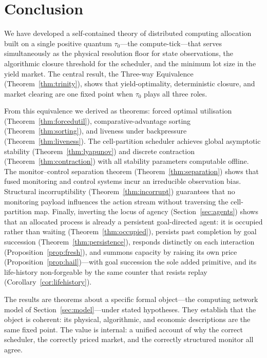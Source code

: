 \documentclass[11pt,twocolumn,a4paper]{article}
\theoremstyle{plain}
\theoremstyle{definition}
\theoremstyle{remark}
\newcommand{\tick}{\tau_0}
\begin{document}
\section{Conclusion}
\label{sec:conclusion}

We have developed a self-contained theory of distributed computing allocation built on a single positive quantum $\tick$---the compute-tick---that serves simultaneously as the physical resolution floor for state observations, the algorithmic closure threshold for the scheduler, and the minimum lot size in the yield market. The central result, the Three-way Equivalence (Theorem~\ref{thm:trinity}), shows that yield-optimality, deterministic closure, and market clearing are one fixed point when $\tick$ plays all three roles.

From this equivalence we derived as theorems: forced optimal utilisation (Theorem~\ref{thm:forcedutil}), comparative-advantage sorting (Theorem~\ref{thm:sorting}), and liveness under backpressure (Theorem~\ref{thm:liveness}). The cell-partition scheduler achieves global asymptotic stability (Theorem~\ref{thm:lyapunov}) and discrete contraction (Theorem~\ref{thm:contraction}) with all stability parameters computable offline. The monitor--control separation theorem (Theorem~\ref{thm:separation}) shows that fused monitoring and control systems incur an irreducible observation bias. Structural incorruptibility (Theorem~\ref{thm:incorrupt}) guarantees that no monitoring payload influences the action stream without traversing the cell-partition map. Finally, inverting the locus of agency (Section~\ref{sec:agents}) shows that an allocated process is already a persistent goal-directed agent: it is occupied rather than waiting (Theorem~\ref{thm:occupied}), persists past completion by goal succession (Theorem~\ref{thm:persistence}), responds distinctly on each interaction (Proposition~\ref{prop:fresh}), and summons capacity by raising its own price (Proposition~\ref{prop:hail})---with goal succession the sole added primitive, and its life-history non-forgeable by the same counter that resists replay (Corollary~\ref{cor:lifehistory}).

The results are theorems about a specific formal object---the computing network model of Section~\ref{sec:model}---under stated hypotheses. They establish that the object is coherent: its physical, algorithmic, and economic descriptions are the same fixed point. The value is internal: a unified account of why the correct scheduler, the correctly priced market, and the correctly structured monitor all agree.



\end{document}
